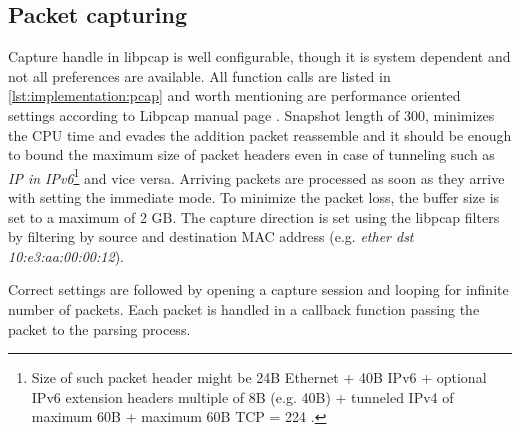 \documentclass[12pt,a4paper,twoside]{report}
\begin{document}
		\subsection{Packet capturing} \label{implementation:sensor:cap}
			Capture handle in libpcap is well configurable, though it is system dependent and not all preferences are available. All function calls are listed in \autoref{lst:implementation:pcap} and worth mentioning are performance oriented settings according to Libpcap manual page \cite{man:pcap}. Snapshot length of 300, minimizes the CPU time and evades the addition packet reassemble and it should be enough to bound the maximum size of packet headers even in case of tunneling such as \emph{IP in IPv6}\footnote{Size of such packet header might be 24B Ethernet + 40B IPv6 + optional IPv6 extension headers multiple of 8B (e.g. 40B) + tunneled IPv4 of maximum 60B + maximum 60B TCP = 224 \cite{man:ipv6}.} and vice versa. Arriving packets are processed as soon as they arrive with setting the immediate mode. To minimize the packet loss, the buffer size is set to a maximum of 2 GB. The capture direction is set using the libpcap filters by filtering by source and destination MAC address (e.g. \emph{ether dst 10:e3:aa:00:00:12}).
			\par
			Correct settings are followed by opening a capture session and looping for infinite number of packets. Each packet is handled in a callback function passing the packet to the parsing process.
\end{document}
